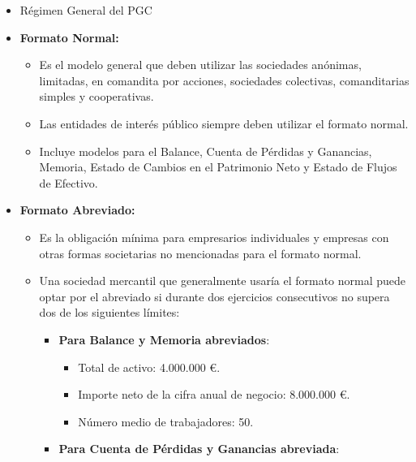 \documentclass[
  paper=a4,
  ,captions=tableheading
]{scrbook}
\providecommand{\tightlist}{%
  \setlength{\itemsep}{0pt}\setlength{\parskip}{0pt}}
\begin{document}
\begin{itemize}
\item
  Régimen General del PGC
\item
  \textbf{Formato Normal:}

  \begin{itemize}
  \tightlist
  \item
    Es el modelo general que deben utilizar las sociedades anónimas,
    limitadas, en comandita por acciones, sociedades colectivas,
    comanditarias simples y cooperativas.
  \item
    Las entidades de interés público siempre deben utilizar el formato
    normal.
  \item
    Incluye modelos para el Balance, Cuenta de Pérdidas y Ganancias,
    Memoria, Estado de Cambios en el Patrimonio Neto y Estado de Flujos
    de Efectivo.
  \end{itemize}
\item
  \textbf{Formato Abreviado:}

  \begin{itemize}
  \tightlist
  \item
    Es la obligación mínima para empresarios individuales y empresas con
    otras formas societarias no mencionadas para el formato normal.
  \item
    Una sociedad mercantil que generalmente usaría el formato normal
    puede optar por el abreviado si durante dos ejercicios consecutivos
    no supera dos de los siguientes límites:

    \begin{itemize}
    \tightlist
    \item
      \textbf{Para Balance y Memoria abreviados}:

      \begin{itemize}
      \tightlist
      \item
        Total de activo: 4.000.000 €.
      \item
        Importe neto de la cifra anual de negocio: 8.000.000 €.
      \item
        Número medio de trabajadores: 50.
      \end{itemize}
    \item
      \textbf{Para Cuenta de Pérdidas y Ganancias abreviada}:


\end{itemize}
\end{itemize}
\end{itemize}
\end{document}
